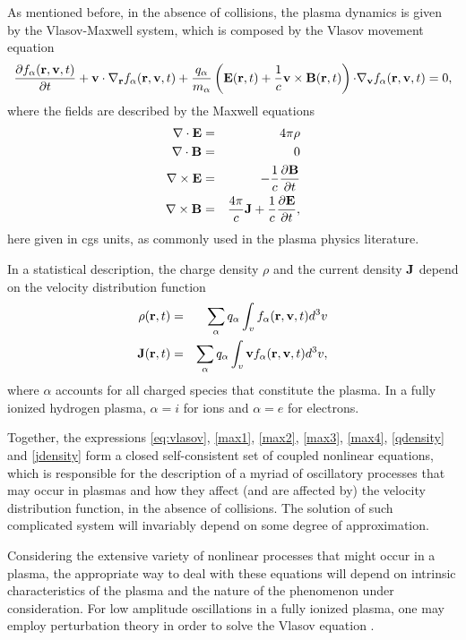 \documentclass[12pt,a4paper,ruledheader]{report}
\begin{document}
As mentioned before, in the absence of collisions, the plasma
dynamics is given by the Vlasov-Maxwell system, which is composed
by the Vlasov movement equation
\begin{equation}
  \label{eq:vlasov}
  \frac{\partial f_{\alpha}({\bf r},{\bf v},t)}{\partial t}
  +{\bf v \cdot \nabla_r}f_{\alpha}({\bf r},{\bf v},t)
  +\frac{q_{\alpha}}{m_{\alpha}}
  \left({\bf E}({\bf r},t)+\frac{1}{c}{\bf v}\times {\bf B}({\bf r},t) \right)
  {\bf \cdot \nabla_v}f_{\alpha}({\bf r},{\bf v},t)=0,
\end{equation}
where the fields are described by the Maxwell equations
\begin{eqnarray}
  \label{max1}
  {\bf \nabla \cdot E}&=& 4\pi\rho\\
  \label{max2}
  {\bf \nabla \cdot B}&=& 0\\
  \label{max3}
    {\bf \nabla \times E}&=& -\frac{1}{c}
   \frac{\partial {\bf B}}{\partial t}\\
  \label{max4}
    {\bf \nabla \times B}&=& \frac{4\pi}{c}{\bf J}
    +\frac{1}{c}\frac{\partial{\bf E}}{\partial t},
\end{eqnarray}
here given in cgs units, as commonly used in the
plasma physics literature.


In a statistical description, the charge density $\rho$
and the current density ${\bf J}$ depend on the velocity
distribution function
\begin{eqnarray}
  \label{qdensity}
    \rho({\bf r},t)
  &=&\sum_{\alpha}q_{\alpha}\int_v
    f_{\alpha}({\bf r},{\bf v},t)d^3v\\
\label{jdensity}
  {\bf J}({\bf r},t)
  &=&\sum_{\alpha}q_{\alpha}\int_v{\bf v}
  f_{\alpha}({\bf r},{\bf v},t) d^3v,
\end{eqnarray}
where $\alpha$ accounts for all charged species that constitute
the plasma. In a fully ionized hydrogen plasma, $\alpha=i$ for
ions and $\alpha=e$ for electrons.

Together, the expressions \eqref{eq:vlasov}, \eqref{max1},
\eqref{max2}, \eqref{max3}, \eqref{max4}, \eqref{qdensity}
and \eqref{jdensity} form a closed self-consistent set
of coupled nonlinear equations, which is responsible for the
description of a myriad of oscillatory processes that may
occur in plasmas and how they affect (and are affected by) the
velocity distribution function, in the absence of collisions.
The solution of such complicated system  will invariably depend
on some degree of approximation.

Considering the extensive variety of nonlinear processes that
might occur in a plasma, the appropriate way to deal with these
equations will depend on intrinsic characteristics of the plasma
and the nature of the phenomenon under consideration. For low
amplitude oscillations in a fully ionized plasma, one may employ
perturbation theory in order to solve the Vlasov equation
\cite{klimo}.
\end{document}

